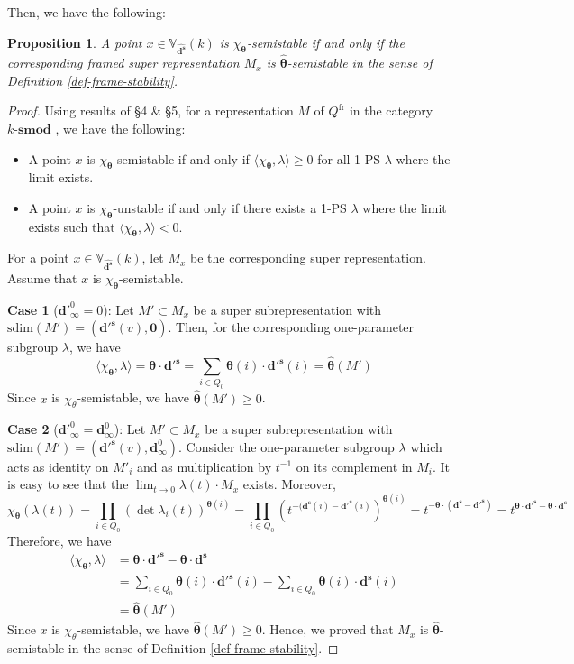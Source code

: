 \documentclass[12pt, reqno]{amsart}
\theoremstyle{plain}
\newtheorem{proposition}[theorem]{Proposition}
\numberwithin{equation}{section}
\def \d{\mathbf{d}}
\def \sd{\mathbf{d^s}}
\def \sdp{\mathbf{d}'^{\mathbf{s}}}
\def \btheta{\boldsymbol{\theta}}
\newcommand{\sdim}{\mathrm{sdim}}
\newcommand{\smod} {k\text{-}\textbf{smod }}
\begin{document}
Then, we have the following:
\begin{proposition}
A point $x\in \mathbb{V}_{\hat{\sd}}(k)$ is $\chi_{\btheta}$-semistable
if and only if the corresponding framed super representation $M_x$ is $\hat{\btheta}$-semistable in the sense of Definition \ref{def-frame-stability}. 
\end{proposition}
\begin{proof}
Using results of \S 4 \& \S 5, for a representation $M$ of $Q^{\mathrm{fr}}$ in the category $\smod$, we have the following:
\begin{itemize}
    \item A point $x$ is $\chi_{\btheta}$-semistable if and only if $\langle \chi_{\btheta}, \lambda \rangle \ge 0$ for all 1-PS $\lambda$ where the limit exists.
    \item A point $x$ is $\chi_{\btheta}$-unstable if and only if there exists a 1-PS $\lambda$ where the limit exists such that $\langle \chi_{\btheta}, \lambda \rangle < 0$.
\end{itemize}
For a point $x \in \mathbb{V}_{\hat{\sd}}(k)$, let $M_x$ be the corresponding super representation.
Assume that $x$ is $\chi_{\btheta}$-semistable. 

\noindent \textbf{Case 1} ($\d'^{0}_{\infty} = 0$): Let $M' \subset M_x$ be a super subrepresentation with $\sdim(M')=(\sdp(v), \mathbf{0})$. Then, for the corresponding one-parameter subgroup $\lambda$, we have
$$
\langle \chi_{\btheta}, \lambda \rangle = \btheta\cdot \sdp = \sum_{i\in Q_0} \btheta(i)\cdot \sdp(i) = \hat{\btheta}(M')
$$
Since $x$ is $\chi_\theta$-semistable, we have $\hat{\btheta}(M') \ge 0$.

\noindent \textbf{Case 2} ($\d'^{0}_{\infty} = \d^{0}_{\infty}$): Let $M' \subset M_x$ be a super subrepresentation with $\sdim(M')=(\sdp(v), \d^{0}_{\infty})$.
Consider the one-parameter subgroup $\lambda$ which acts as identity on $M'_i$ and as multiplication by $t^{-1}$ on its complement in $M_i$. It is easy to see that the 
$\lim_{t \to 0} \lambda(t) \cdot M_x$ exists. Moreover,
\[
\chi_{\btheta}(\lambda(t)) = \prod_{i \in Q_0} (\det \lambda_i(t))^{\btheta(i)} = \prod_{i \in Q_0} (t^{-(\sd(i) - \sdp(i)})^{\btheta(i)} = t^{-\btheta \cdot (\sd - \sdp)} = t^{\btheta \cdot \sdp - \btheta \cdot \sd}
\]
Therefore, we have 
\[
\begin{aligned}
\langle \chi_{\btheta}, \lambda \rangle 
& = \btheta\cdot \sdp - \btheta \cdot \sd \\
& = \sum_{i\in Q_0} \btheta(i)\cdot \sdp(i) - \sum_{i \in Q_0} \btheta(i) \cdot \sd(i) \\
& = \hat{\btheta}(M')
\end{aligned}
\]
Since $x$ is $\chi_\theta$-semistable, we have $\hat{\btheta}(M') \ge 0$. Hence, we proved that $M_x$ is $\hat{\btheta}$-semistable in the sense of Definition \ref{def-frame-stability}.


\end{proof}
\end{document}
